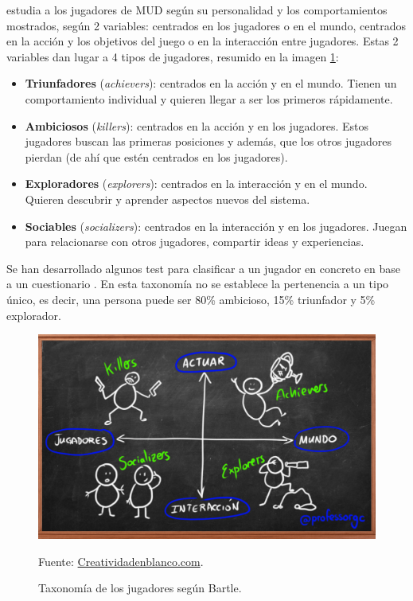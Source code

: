  \cite{TypeMUD} estudia a los jugadores de \gls{MUD} según su personalidad y los comportamientos mostrados, según 2 variables: centrados en los jugadores o en el mundo, centrados en la acción y los objetivos del juego o en la interacción entre jugadores.
%
Estas 2 variables dan lugar a 4 tipos de jugadores, resumido en la imagen \ref{fig::Bartle}:
\begin{itemize}
	\item  \textbf{Triunfadores} (\textit{achievers}): centrados en la acción y en el mundo.
	Tienen un comportamiento individual y quieren llegar a ser los primeros rápidamente.
	

	\item \textbf{Ambiciosos} (\textit{killers}): centrados en la acción y en los jugadores. 
	Estos jugadores buscan las primeras posiciones y además, que los otros jugadores pierdan (de ahí que estén centrados en los jugadores).
	

	\item \textbf{Exploradores} (\textit{explorers}): centrados en la interacción y en el mundo.
	Quieren descubrir y aprender aspectos nuevos del sistema.

	\item \textbf{Sociables} (\textit{socializers}): centrados en la interacción y en los jugadores.
	Juegan para relacionarse con otros jugadores, compartir ideas y experiencias.
\end{itemize}

Se han desarrollado algunos test para clasificar a un jugador en concreto en base a un cuestionario  \cite{Bartletest}.
%
En esta taxonomía no se establece la pertenencia a un tipo único, es decir, una persona puede ser 80\% ambicioso, 15\% triunfador y 5\% explorador.


\begin{figure}[hbt]
\begin{center}
\includegraphics[scale=0.25]{img/Bartle.png}
\caption{Taxonomía de los jugadores según Bartle.}
\label{fig::Bartle}
\vspace{-0.25cm}
\small{Fuente: \url{Creatividadenblanco.com}.}
\end{center}
\end{figure}

